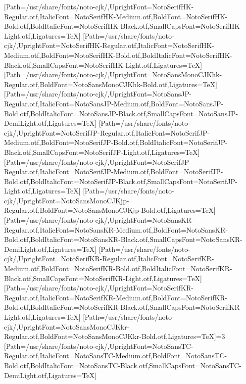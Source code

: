 \newfontfamily{}[Path=/usr/share/fonts/noto-cjk/,UprightFont=NotoSerifHK-Regular.otf,ItalicFont=NotoSerifHK-Medium.otf,BoldFont=NotoSerifHK-Bold.otf,BoldItalicFont=NotoSerifHK-Black.otf,SmallCapsFont=NotoSerifHK-Light.otf,Ligatures=TeX]
\newfontfamily{}[Path=/usr/share/fonts/noto-cjk/,UprightFont=NotoSerifHK-Regular.otf,ItalicFont=NotoSerifHK-Medium.otf,BoldFont=NotoSerifHK-Bold.otf,BoldItalicFont=NotoSerifHK-Black.otf,SmallCapsFont=NotoSerifHK-Light.otf,Ligatures=TeX]
\newfontfamily{}[Path=/usr/share/fonts/noto-cjk/,UprightFont=NotoSansMonoCJKhk-Regular.otf,BoldFont=NotoSansMonoCJKhk-Bold.otf,Ligatures=TeX]
\newfontfamily{}[Path=/usr/share/fonts/noto-cjk/,UprightFont=NotoSansJP-Regular.otf,ItalicFont=NotoSansJP-Medium.otf,BoldFont=NotoSansJP-Bold.otf,BoldItalicFont=NotoSansJP-Black.otf,SmallCapsFont=NotoSansJP-DemiLight.otf,Ligatures=TeX]
\newfontfamily{}[Path=/usr/share/fonts/noto-cjk/,UprightFont=NotoSerifJP-Regular.otf,ItalicFont=NotoSerifJP-Medium.otf,BoldFont=NotoSerifJP-Bold.otf,BoldItalicFont=NotoSerifJP-Black.otf,SmallCapsFont=NotoSerifJP-Light.otf,Ligatures=TeX]
\newfontfamily{}[Path=/usr/share/fonts/noto-cjk/,UprightFont=NotoSerifJP-Regular.otf,ItalicFont=NotoSerifJP-Medium.otf,BoldFont=NotoSerifJP-Bold.otf,BoldItalicFont=NotoSerifJP-Black.otf,SmallCapsFont=NotoSerifJP-Light.otf,Ligatures=TeX]
\newfontfamily{}[Path=/usr/share/fonts/noto-cjk/,UprightFont=NotoSansMonoCJKjp-Regular.otf,BoldFont=NotoSansMonoCJKjp-Bold.otf,Ligatures=TeX]
\newfontfamily{}[Path=/usr/share/fonts/noto-cjk/,UprightFont=NotoSansKR-Regular.otf,ItalicFont=NotoSansKR-Medium.otf,BoldFont=NotoSansKR-Bold.otf,BoldItalicFont=NotoSansKR-Black.otf,SmallCapsFont=NotoSansKR-DemiLight.otf,Ligatures=TeX]
\newfontfamily{}[Path=/usr/share/fonts/noto-cjk/,UprightFont=NotoSerifKR-Regular.otf,ItalicFont=NotoSerifKR-Medium.otf,BoldFont=NotoSerifKR-Bold.otf,BoldItalicFont=NotoSerifKR-Black.otf,SmallCapsFont=NotoSerifKR-Light.otf,Ligatures=TeX]
\newfontfamily{}[Path=/usr/share/fonts/noto-cjk/,UprightFont=NotoSerifKR-Regular.otf,ItalicFont=NotoSerifKR-Medium.otf,BoldFont=NotoSerifKR-Bold.otf,BoldItalicFont=NotoSerifKR-Black.otf,SmallCapsFont=NotoSerifKR-Light.otf,Ligatures=TeX]
\newfontfamily{}[Path=/usr/share/fonts/noto-cjk/,UprightFont=NotoSansMonoCJKkr-Regular.otf,BoldFont=NotoSansMonoCJKkr-Bold.otf,Ligatures=TeX]\else\ifnum\value{NotoCJKFamily}=3
\newfontfamily{}[Path=/usr/share/fonts/noto-cjk/,UprightFont=NotoSansTC-Regular.otf,ItalicFont=NotoSansTC-Medium.otf,BoldFont=NotoSansTC-Bold.otf,BoldItalicFont=NotoSansTC-Black.otf,SmallCapsFont=NotoSansTC-DemiLight.otf,Ligatures=TeX]
